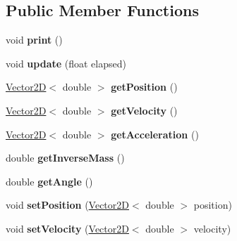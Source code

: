 \subsection*{Public Member Functions}
\begin{DoxyCompactItemize}
\item 
\hypertarget{class_collidable_ac4597915c92e32ea10220808da31c750}{}void {\bfseries print} ()\label{class_collidable_ac4597915c92e32ea10220808da31c750}

\item 
\hypertarget{class_collidable_ad636cf1a7fab85fb2dfedf08c02c7745}{}void {\bfseries update} (float elapsed)\label{class_collidable_ad636cf1a7fab85fb2dfedf08c02c7745}

\item 
\hypertarget{class_collidable_ad5022811d28d0db8a58e4ecfda914f4b}{}\hyperlink{class_vector2_d}{Vector2\+D}$<$ double $>$ {\bfseries get\+Position} ()\label{class_collidable_ad5022811d28d0db8a58e4ecfda914f4b}

\item 
\hypertarget{class_collidable_abfdcd815a5f8aabd860e2b69bc4bea21}{}\hyperlink{class_vector2_d}{Vector2\+D}$<$ double $>$ {\bfseries get\+Velocity} ()\label{class_collidable_abfdcd815a5f8aabd860e2b69bc4bea21}

\item 
\hypertarget{class_collidable_ac6387b72fd5e194cd3e38cf22e30e75a}{}\hyperlink{class_vector2_d}{Vector2\+D}$<$ double $>$ {\bfseries get\+Acceleration} ()\label{class_collidable_ac6387b72fd5e194cd3e38cf22e30e75a}

\item 
\hypertarget{class_collidable_a3ceb05fc466651c75f1c23231a9cf7a9}{}double {\bfseries get\+Inverse\+Mass} ()\label{class_collidable_a3ceb05fc466651c75f1c23231a9cf7a9}

\item 
\hypertarget{class_collidable_aee9547a28db55d503164cdf5f3d069fc}{}double {\bfseries get\+Angle} ()\label{class_collidable_aee9547a28db55d503164cdf5f3d069fc}

\item 
\hypertarget{class_collidable_ab4a89fa87f6e2ea151c5e8c9e80847b3}{}void {\bfseries set\+Position} (\hyperlink{class_vector2_d}{Vector2\+D}$<$ double $>$ position)\label{class_collidable_ab4a89fa87f6e2ea151c5e8c9e80847b3}

\item 
\hypertarget{class_collidable_a3b218cc8ee1f40a5cfce42b764615ac6}{}void {\bfseries set\+Velocity} (\hyperlink{class_vector2_d}{Vector2\+D}$<$ double $>$ velocity)\label{class_collidable_a3b218cc8ee1f40a5cfce42b764615ac6}


\end{DoxyCompactItemize}
